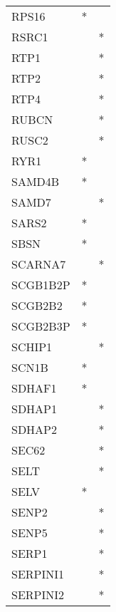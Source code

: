 \begin{longtable}{lcc}
RPS16            &              * &            \\
RSRC1            &                &          * \\
RTP1             &                &          * \\
RTP2             &                &          * \\
RTP4             &                &          * \\
RUBCN            &                &          * \\
RUSC2            &                &          * \\
RYR1             &              * &            \\
SAMD4B           &              * &            \\
SAMD7            &                &          * \\
SARS2            &              * &            \\
SBSN             &              * &            \\
SCARNA7          &                &          * \\
SCGB1B2P         &              * &            \\
SCGB2B2          &              * &            \\
SCGB2B3P         &              * &            \\
SCHIP1           &                &          * \\
SCN1B            &              * &            \\
SDHAF1           &              * &            \\
SDHAP1           &                &          * \\
SDHAP2           &                &          * \\
SEC62            &                &          * \\
SELT             &                &          * \\
SELV             &              * &            \\
SENP2            &                &          * \\
SENP5            &                &          * \\
SERP1            &                &          * \\
SERPINI1         &                &          * \\
SERPINI2         &                &          * \\

\end{longtable}
